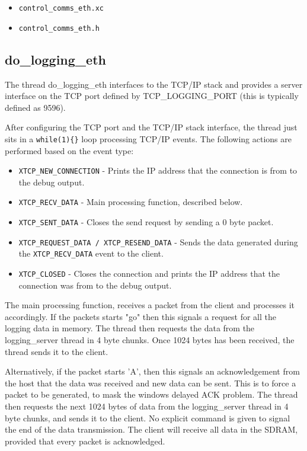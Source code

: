 \begin{itemize}
\item \verb!control_comms_eth.xc!
\item \verb!control_comms_eth.h!
\end{itemize}


\subsection{do\_logging\_eth}

The thread do\_logging\_eth interfaces to the TCP/IP stack and provides a server interface on the TCP port defined by TCP\_LOGGING\_PORT (this is typically defined as 9596).

After configuring the TCP port and the TCP/IP stack interface, the thread just sits in a \verb!while(1){}! loop processing TCP/IP events. 
The following actions are performed based on the event type:

\begin{itemize}
\item \verb!XTCP_NEW_CONNECTION! - Prints the IP address that the connection is from to the debug output.
\item \verb!XTCP_RECV_DATA! - Main processing function, described below.
\item \verb!XTCP_SENT_DATA! - Closes the send request by sending a 0 byte packet.
\item \verb!XTCP_REQUEST_DATA / XTCP_RESEND_DATA! - Sends the data generated during the \verb!XTCP_RECV_DATA! event to the client.
\item \verb!XTCP_CLOSED! - Closes the connection and prints the IP address that the connection was from to the debug output.
\end{itemize}

The main processing function, receives a packet from the client and processes it accordingly.
If the packets starts "go" then this signals a request for all the logging data in memory.
The thread then requests the data from the logging\_server thread in 4 byte chunks.
Once 1024 bytes has been received, the thread sends it to the client.

Alternatively, if the packet starts 'A', then this signals an acknowledgement from the host that the data was received and new data can be sent.
This is to force a packet to be generated, to mask the windows delayed ACK problem.
The thread then requests the next 1024 bytes of data from the logging\_server thread in 4 byte chunks, and sends it to the client.
No explicit command is given to signal the end of the data transmission.
The client will receive all data in the SDRAM, provided that every packet is acknowledged.

